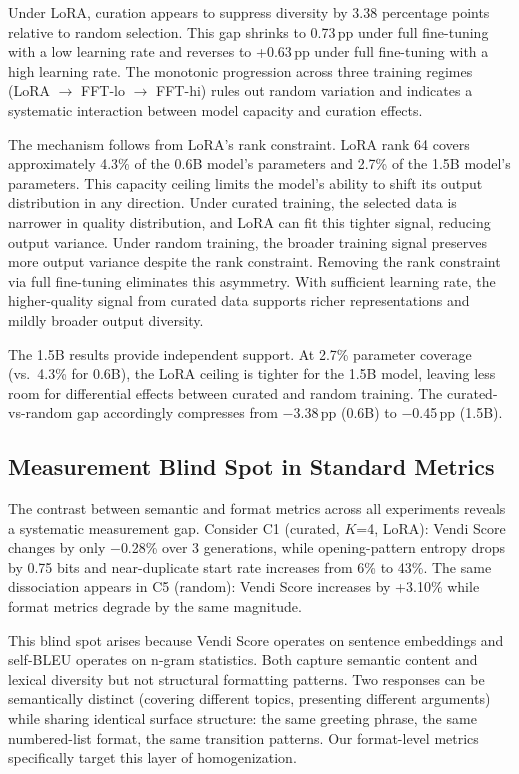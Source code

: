 \documentclass[11pt,a4paper]{article}
\begin{document}
Under LoRA, curation appears to suppress diversity by 3.38 percentage points relative to random selection. This gap shrinks to 0.73\,pp under full fine-tuning with a low learning rate and reverses to +0.63\,pp under full fine-tuning with a high learning rate. The monotonic progression across three training regimes (LoRA $\to$ FFT-lo $\to$ FFT-hi) rules out random variation and indicates a systematic interaction between model capacity and curation effects.

The mechanism follows from LoRA's rank constraint. LoRA rank 64 covers approximately 4.3\% of the 0.6B model's parameters and 2.7\% of the 1.5B model's parameters. This capacity ceiling limits the model's ability to shift its output distribution in any direction. Under curated training, the selected data is narrower in quality distribution, and LoRA can fit this tighter signal, reducing output variance. Under random training, the broader training signal preserves more output variance despite the rank constraint. Removing the rank constraint via full fine-tuning eliminates this asymmetry. With sufficient learning rate, the higher-quality signal from curated data supports richer representations and mildly broader output diversity.

The 1.5B results provide independent support. At 2.7\% parameter coverage (vs.\ 4.3\% for 0.6B), the LoRA ceiling is tighter for the 1.5B model, leaving less room for differential effects between curated and random training. The curated-vs-random gap accordingly compresses from $-$3.38\,pp (0.6B) to $-$0.45\,pp (1.5B).

\subsection{Measurement Blind Spot in Standard Metrics}
\label{sec:measurement}

The contrast between semantic and format metrics across all experiments reveals a systematic measurement gap. Consider C1 (curated, $K$=4, LoRA): Vendi Score changes by only $-$0.28\% over 3 generations, while opening-pattern entropy drops by 0.75 bits and near-duplicate start rate increases from 6\% to 43\%. The same dissociation appears in C5 (random): Vendi Score increases by +3.10\% while format metrics degrade by the same magnitude.

This blind spot arises because Vendi Score operates on sentence embeddings and self-BLEU operates on n-gram statistics. Both capture semantic content and lexical diversity but not structural formatting patterns. Two responses can be semantically distinct (covering different topics, presenting different arguments) while sharing identical surface structure: the same greeting phrase, the same numbered-list format, the same transition patterns. Our format-level metrics specifically target this layer of homogenization.
\end{document}
